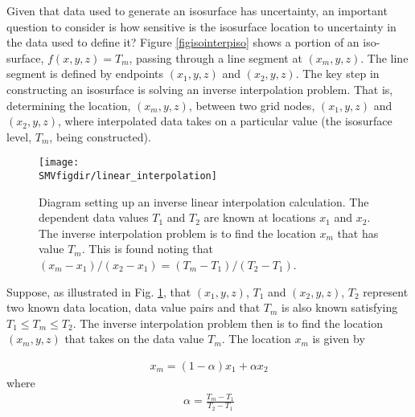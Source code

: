 \documentclass[11pt,twoside]{book}
\begin{document}
Given that data used to generate an isosurface has uncertainty, an
important question to consider is how sensitive is the isosurface
location to uncertainty in the data used to define it? Figure \ref{figisointerpiso}
shows a portion of an iso-surface, $f(x,y,z)=T_m$, passing through a line segment
at $(x_m,y,z)$. The line segment is defined by endpoints $(x_1,y,z)$ and $(x_2,y,z)$.
The key step in constructing an isosurface is solving an inverse interpolation problem.
That is, determining the location, $(x_m,y,z)$, between two grid nodes,
$(x_1,y,z)$ and $(x_2,y,z)$, where interpolated data takes on a particular value
(the isosurface level, $T_m$, being constructed).

\begin{figure}[bph]
\begin{center}
\texttt{[image: \\SMVfigdir/linear\_interpolation]}
\end{center}
\caption[Diagram setting up an inverse linear interpolation calculation]
{Diagram setting up an inverse linear interpolation calculation.
The dependent data values $T_1$ and $T_2$ are known at locations $x_1$ and $x_2$.
The inverse interpolation problem is to find the location $x_m$ that has value $T_m$.
This is found noting that $(x_m-x_1)/(x_2-x_1)=(T_m-T_1)/(T_2-T_1)$.
 }
\label{figisointerp}%
\end{figure}

Suppose, as illustrated in Fig. \ref{figisointerp}, that $(x_1,y,z)$, $T_1$ and
$(x_2,y,z)$, $T_2$ represent two known data location, data value pairs and
that $T_m$ is also known satisfying $T_1\le T_m \le T_2$.  The inverse
interpolation problem then is to find the location $(x_m,y,z)$ that takes on
the data value $T_m$.  The location $x_m$ is given by

\begin{eqnarray}
x_m=(1-\alpha)x_1+\alpha x_2
\end{eqnarray}
where
\begin{eqnarray}
\alpha=\frac{T_m-T_1}{T_2-T_1}
\end{eqnarray}
\end{document}
